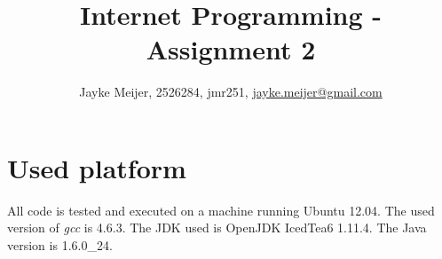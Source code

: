 \documentclass[a4paper]{article}
\title{Internet Programming - Assignment 2}
\author{Jayke Meijer, 2526284, jmr251, \url{jayke.meijer@gmail.com}}
\begin{document}
\maketitle

\tableofcontents
\pagebreak

\section{Used platform}

All code is tested and executed on a machine running Ubuntu 12.04. The used version of
\emph{gcc} is 4.6.3. The JDK used is OpenJDK IcedTea6 1.11.4. The Java version is
1.6.0\_24.
\end{document}
